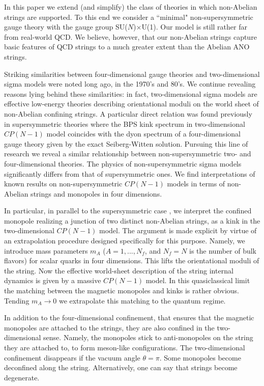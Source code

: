 In this paper  we extend (and simplify) the class of theories in
which non-Abelian strings are supported. To this end we consider 
a ``minimal" non-supersymmetric
gauge theory with the gauge group SU($N$)$\times$U(1).
Our model is still rather far  from real-world QCD. We
believe, however,  that our non-Abelian strings capture basic features
of QCD strings to a much greater extent than the  Abelian ANO strings.

Striking similarities between four-dimensional gauge theories and 
two-dimensio\-nal sigma models were noted  long ago, in 
the 1970's and 80's.  We continue revealing
reasons lying behind these similarities: in fact,  
two-dimensional sigma models
are effective low-energy theories describing  orientational moduli on the world sheet
of non-Abelian confining strings. A particular direct relation was found
previously  in  \ntwo supersymmetric theories 
\cite{Dorey:1998yh,Dorey:1999zk,ShifmanYung,HananyTong}
where the BPS kink spectrum in two-dimensional
$CP(N-1)$ model coincides with the dyon spectrum of 
a four-dimensional gauge
theory given by the exact Seiberg-Witten solution. Pursuing this line of 
research we reveal a similar relationship
between non-supersymmetric
two- and four-dimensional theories. The physics of non-supersymmetric 
sigma models significantly 
differs from that of supersymmetric ones. We find interpretations 
of known results on non-supersymmetric $CP(N-1)$ models in terms 
of non-Abelian strings  and monopoles in four dimensions.

In particular,  in parallel
to the supersymmetric case \cite{Tong,ShifmanYung,HananyTong},
we interpret the confined monopole realizing  a junction of two
distinct  non-Abelian
strings,   as a kink in the  two-dimensional $CP(N-1)$ model.
The argument is made explicit by virtue of an extrapolation procedure
designed specifically for this purpose. Namely, 
we introduce   mass parameters
$m_A$ ($A=1,...,N_f$, and $N_f=N$ is the number of bulk flavors)
for scalar quarks in four dimensions. This lifts the orientational moduli of the string.
Now the effective world-sheet description of the string internal 
dynamics   is given by a massive $CP(N-1)$ model.
In this quasiclassical limit the matching 
between the magnetic monopoles and kinks
is rather obvious. Tending $m_A \to 0$ we extrapolate this matching to the
quantum regime.

In addition to  the four-dimensional
confinement, that ensures
that the magnetic monopoles are attached to the strings, they are also
confined in the two-dimensional sense. Namely, the monopoles stick to
anti-monopoles on the string
they are attached to, to form   meson-like configurations.
The  two-dimensional
confinement disappears if the vacuum angle 
$\theta=\pi$. Some monopoles become deconfined along the string.
Alternatively, one can say that strings become degenerate.

